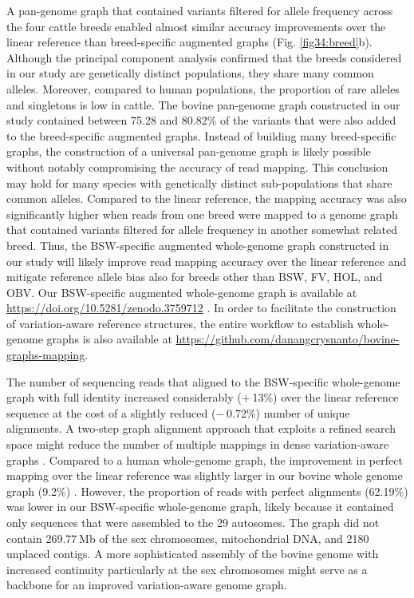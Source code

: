 \documentclass[../main.tex]{subfiles}
\begin{document}
A pan-genome graph that contained variants filtered for allele frequency across the four cattle breeds enabled almost similar accuracy improvements over the linear reference than breed-specific augmented graphs (Fig. \ref{fig34:breed}b). Although the principal component analysis confirmed that the breeds considered in our study are genetically distinct populations, they share many common alleles. Moreover, compared to human populations, the proportion of rare alleles and singletons is low in cattle. The bovine pan-genome graph constructed in our study contained between 75.28 and 80.82\% of the variants that were also added to the breed-specific augmented graphs. Instead of building many breed-specific graphs, the construction of a universal pan-genome graph is likely possible without notably compromising the accuracy of read mapping. This conclusion may hold for many species with genetically distinct sub-populations that share common alleles. Compared to the linear reference, the mapping accuracy was also significantly higher when reads from one breed were mapped to a genome graph that contained variants filtered for allele frequency in another somewhat related breed. Thus, the BSW-specific augmented whole-genome graph constructed in our study will likely improve read mapping accuracy over the linear reference and mitigate reference allele bias also for breeds other than BSW, FV, HOL, and OBV. Our BSW-specific augmented whole-genome graph is available at \url{https://doi.org/10.5281/zenodo.3759712} \citep{Crysnanto2020data}. In order to facilitate the construction of variation-aware reference structures, the entire workflow to establish whole-genome graphs is also available at \url{https://github.com/danangcrysnanto/bovine-graphs-mapping}.

The number of sequencing reads that aligned to the BSW-specific whole-genome graph with full identity increased considerably ($+$ 13\%) over the linear reference sequence at the cost of a slightly reduced ($−$ 0.72\%) number of unique alignments. A two-step graph alignment approach that exploits a refined search space might reduce the number of multiple mappings in dense variation-aware graphs \citep{grytten2020assessing}. Compared to a human whole-genome graph, the improvement in perfect mapping over the linear reference was slightly larger in our bovine whole genome graph (9.2\%) \citep{garrison2018variation}. However, the proportion of reads with perfect alignments (62.19\%) was lower in our BSW-specific whole-genome graph, likely because it contained only sequences that were assembled to the 29 autosomes. The graph did not contain 269.77 Mb of the sex chromosomes, mitochondrial DNA, and 2180 unplaced contigs. A more sophisticated assembly of the bovine genome with increased continuity particularly at the sex chromosomes \citep{rice2020continuous,liu2019new} might serve as a backbone for an improved variation-aware genome graph.
\end{document}
